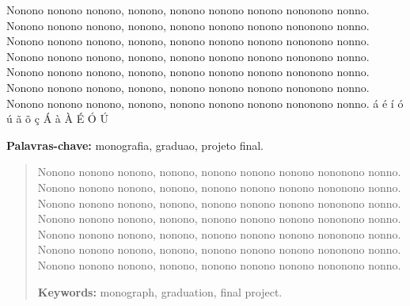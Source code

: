 \documentclass[normaltoc,capchap,capsec,times]{abnt}
\begin{document}



\begin{resumo}
Nonono nonono nonono, nonono, nonono nonono nonono nononono nonno.
Nonono nonono nonono, nonono, nonono nonono nonono nononono nonno.
Nonono nonono nonono, nonono, nonono nonono nonono nononono nonno.
Nonono nonono nonono, nonono, nonono nonono nonono nononono nonno.
Nonono nonono nonono, nonono, nonono nonono nonono nononono nonno.
Nonono nonono nonono, nonono, nonono nonono nonono nononono nonno.
Nonono nonono nonono, nonono, nonono nonono nonono nononono nonno.
á é í ó ú ã õ ç Á à À É Ó Ú 

\textbf{Palavras-chave:}
monografia,
graduao, 
projeto final.
\end{resumo}

\begin{abstract}
Nonono nonono nonono, nonono, nonono nonono nonono nononono nonno.
Nonono nonono nonono, nonono, nonono nonono nonono nononono nonno.
Nonono nonono nonono, nonono, nonono nonono nonono nononono nonno.
Nonono nonono nonono, nonono, nonono nonono nonono nononono nonno.
Nonono nonono nonono, nonono, nonono nonono nonono nononono nonno.
Nonono nonono nonono, nonono, nonono nonono nonono nononono nonno.
Nonono nonono nonono, nonono, nonono nonono nonono nononono nonno.

\textbf{Keywords:} 
monograph,
graduation,
final project.
\end{abstract}

\listadefiguras
\listadesiglas

\sumario







\end{document}
